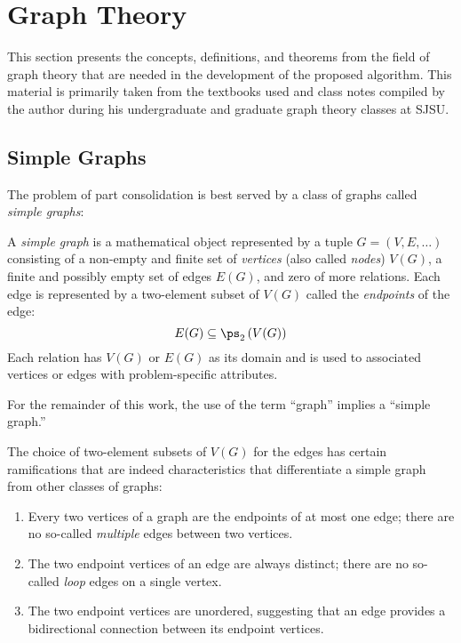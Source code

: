\section{Graph Theory}

This section presents the concepts, definitions, and theorems from the field of graph theory that are needed in the
development of the proposed algorithm.  This material is primarily taken from the textbooks used
\cite{chartrand,west} and class notes compiled by the author during his undergraduate and graduate graph theory
classes at SJSU.

\subsection{Simple Graphs}

The problem of part consolidation is best served by a class of graphs called \emph{simple graphs}:

\begin{definition}
  A \emph{simple graph} is a mathematical object represented by a tuple \(G=(V,E,\ldots)\) consisting of a
  non-empty and finite set of \emph{vertices} (also called \emph{nodes}) \(V(G)\), a finite and possibly empty set
  of edges \(E(G)\), and zero of more relations.  Each edge is represented by a two-element subset of \(V(G)\)
  called the \emph{endpoints} of the edge:
  \[E(G)\subseteq\ps_2\left(V(G)\right)\]
  Each relation has \(V(G)\) or \(E(G)\) as its domain and is used to associated vertices or edges with
  problem-specific attributes.
\end{definition}

For the remainder of this work, the use of the term ``graph'' implies a ``simple graph.''

The choice of two-element subsets of \(V(G)\) for the edges has certain ramifications that are indeed characteristics
that differentiate a simple graph from other classes of graphs:
\begin{enumerate}
\item Every two vertices of a graph are the endpoints of at most one edge; there are no so-called
  \emph{multiple} edges between two vertices.
\item The two endpoint vertices of an edge are always distinct; there are no so-called \emph{loop} edges on a
  single vertex.
\item The two endpoint vertices are unordered, suggesting that an edge provides a bidirectional connection between
  its endpoint vertices.
\end{enumerate}

